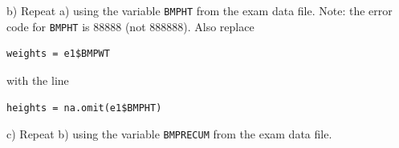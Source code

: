 \documentclass[10pt]{article}
\begin{document}
\hspace{10pt} b) Repeat a) using the variable \texttt{BMPHT} from the exam data file.
Note:  the error code for \texttt{BMPHT} is 88888 (not 888888).  Also replace 
\begin{verbatim}
weights = e1$BMPWT
\end{verbatim}
with the line 
\begin{verbatim}
heights = na.omit(e1$BMPHT)
\end{verbatim}

\hspace{10pt} c) Repeat b) using the variable \texttt{BMPRECUM} from the exam data file.
\vfill
\eject
\end{document}
